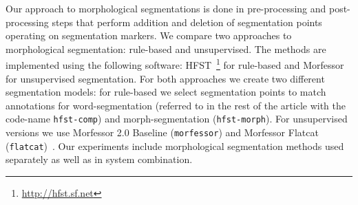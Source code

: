\documentclass[free]{flammie}
\begin{document}



\label{sec:morph-segmentation}

Our approach to morphological segmentations is done in
pre-processing and post-processing steps that  perform addition and deletion of segmentation points operating on segmentation markers.
We compare two approaches to morphological segmentation: rule-based and unsupervised.
The methods are implemented using the following software: HFST~\cite{hfst}\footnote{\url{http://hfst.sf.net}} for rule-based and Morfessor~\cite{morfessor} for unsupervised segmentation.
For both approaches we create two different segmentation models: for rule-based we select segmentation points to match annotations for word-segmentation (referred to in the rest of the article with the code-name \texttt{hfst-comp}) and morph-segmentation (\texttt{hfst-morph}).
For unsupervised versions we use Morfessor 2.0 Baseline (\texttt{morfessor}) and Morfessor Flatcat (\texttt{flatcat})~\cite{flatcat}.
Our experiments include morphological segmentation methods used separately as well as in system combination.
\end{document}
